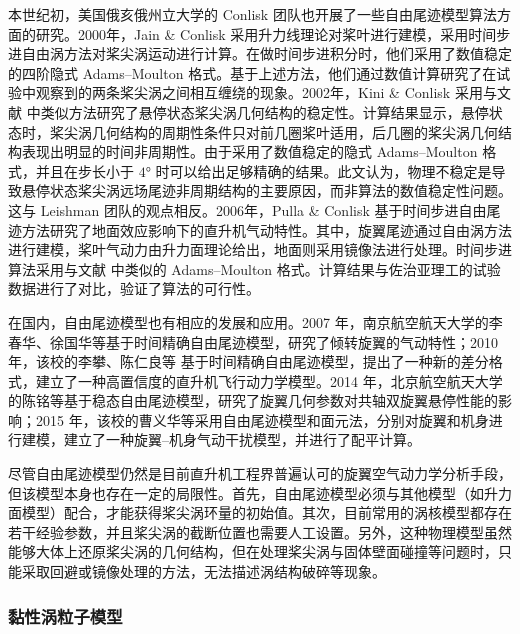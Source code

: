 本世纪初，美国俄亥俄州立大学的 Conlisk 团队也开展了一些自由尾迹模型算法方面的研究。2000年，Jain
\& Conlisk 采用升力线理论对桨叶进行建模，采用时间步进自由涡方法对桨尖涡运动进行计算。在做时间步进积分时，他们采用了数值稳定的四阶隐式
Adams–Moulton 格式。基于上述方法，他们通过数值计算研究了在试验中观察到的两条桨尖涡之间相互缠绕的现象。2002年，Kini
\& Conlisk 采用与文献 \cite{Jain2000} 中类似方法研究了悬停状态桨尖涡几何结构的稳定性。计算结果显示，悬停状态时，桨尖涡几何结构的周期性条件只对前几圈桨叶适用，后几圈的桨尖涡几何结构表现出明显的时间非周期性。由于采用了数值稳定的隐式
Adams–Moulton 格式，并且在步长小于 $\ang{4}$ 时可以给出足够精确的结果。此文认为，物理不稳定是导致悬停状态桨尖涡远场尾迹非周期结构的主要原因，而非算法的数值稳定性问题。这与
Leishman 团队的观点相反。2006年，Pulla
\& Conlisk 基于时间步进自由尾迹方法研究了地面效应影响下的直升机气动特性。其中，旋翼尾迹通过自由涡方法进行建模，桨叶气动力由升力面理论给出，地面则采用镜像法进行处理。时间步进算法采用与文献 \cite{Jain2000,Kini2002}
中类似的 Adams–Moulton 格式。计算结果与佐治亚理工的试验数据进行了对比，验证了算法的可行性。

在国内，自由尾迹模型也有相应的发展和应用。2007 年，南京航空航天大学的李春华、徐国华等基于时间精确自由尾迹模型，研究了倾转旋翼的气动特性；2010
年，该校的李攀、陈仁良等 基于时间精确自由尾迹模型，提出了一种新的差分格式，建立了一种高置信度的直升机飞行动力学模型。2014
年，北京航空航天大学的陈铭等基于稳态自由尾迹模型，研究了旋翼几何参数对共轴双旋翼悬停性能的影响；2015
年，该校的曹义华等采用自由尾迹模型和面元法，分别对旋翼和机身进行建模，建立了一种旋翼–机身气动干扰模型，并进行了配平计算。

尽管自由尾迹模型仍然是目前直升机工程界普遍认可的旋翼空气动力学分析手段，但该模型本身也存在一定的局限性。首先，自由尾迹模型必须与其他模型（如升力面模型）配合，才能获得桨尖涡环量的初始值。其次，目前常用的涡核模型都存在若干经验参数，并且桨尖涡的截断位置也需要人工设置。另外，这种物理模型虽然能够大体上还原桨尖涡的几何结构，但在处理桨尖涡与固体壁面碰撞等问题时，只能采取回避或镜像处理的方法，无法描述涡结构破碎等现象。

\subsubsection{黏性涡粒子模型\label{sec:Viscous-Vortex-Particle-Method}}

